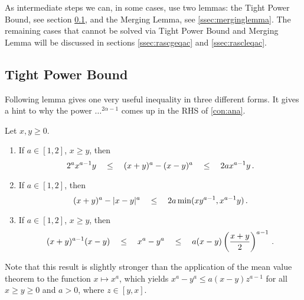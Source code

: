 As intermediate steps we can, in some cases, use two lemmas: the Tight Power Bound, see section \ref{ssec:tightpowerbound}, and the Merging Lemma, see \ref{ssec:merginglemma}.
The remaining cases that cannot be solved via Tight Power Bound and Merging Lemma will be discussed in sections \ref{ssec:rascgeqac} and \ref{ssec:rascleqac}.
%
%
%
\subsection{Tight Power Bound}\label{ssec:tightpowerbound}
%
Following lemma gives one very useful inequality in three different forms. It gives a hint to why the power $\dots^{2\alpha-1}$ comes up in the RHS of \autoref{con:ana}.
%
\begin{lemma}\label{lmm:tightpowerbound}
	Let $x,y\geq0$.
	\begin{enumerate}[label=\environmentEnumerateLabel]
	\item 
		If  $a\in[1,2]$, $x\geq y$, then
		\begin{equation*}
			2^a x^{a-1}y \quad\leq\quad (x+y)^a-(x-y)^a \quad\leq\quad 2a x^{a-1}y \, .
		\end{equation*}
	\item 
		If  $a\in[1,2]$, then
		\begin{equation*}
			(x+y)^a-|x-y|^a \quad\leq\quad 2a\min(xy^{a-1},x^{a-1}y)\, .
		\end{equation*}
	\item 
		If  $a\in[1,2]$, $x\geq y$, then
		\begin{equation*}
			(x+y)^{a-1} (x-y) \quad\leq\quad x^a - y^a \quad\leq\quad a (x-y) \left( \frac{x+y}{2} \right)^{a-1}
			\, .
		\end{equation*}
	\end{enumerate}
\end{lemma}
%
Note that this result is slightly stronger than the application of the mean value theorem to the function $x \mapsto x^a$, which yields $x^a - y^a \leq a (x-y) z^{a-1}$ for all $x \geq y \geq 0$ and $a > 0$, where $z \in [y,x]$.
%
